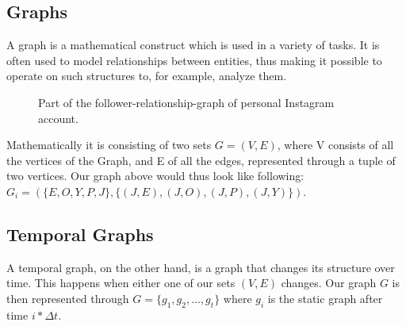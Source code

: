 \documentclass[sigconf]{acmart}
\begin{document}
\subsection{Graphs}
A graph is a mathematical construct which is used in a variety of tasks. It is often used to model relationships between 
entities, thus making it possible to operate on such structures to, for example, analyze them.\\
\begin{figure}[h]
  \begin{center}
\end{center}
\caption{Part of the follower-relationship-graph of personal Instagram account.}
\end{figure}
 Mathematically it is consisting of two sets \(G = (V, E)\), where V consists of all the vertices of the Graph, and E of all the edges, represented through a tuple of two vertices.
 Our graph above would thus look like following: \\
 \( G_i = (\{E,O,Y,P,J\}, \{(J,E),(J,O), (J,P), (J,Y)\}) \).

\subsection{Temporal Graphs}
A temporal graph, on the other hand, is a graph that changes its structure over time. This happens when either one of our sets \((V,E)\) changes. %
Our graph \(G\) is then represented through \(G = \{g_1, g_2, \ldots, g_t\}\) where \(g_i\) is the static graph after time \(i*\Delta t\).
\cite{DBLP:journals/corr/abs-1905-05304}
\end{document}
